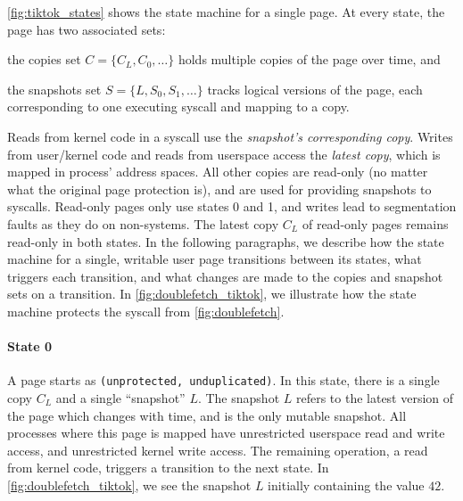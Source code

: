 \documentclass[letterpaper,twocolumn,10pt, anonymous]{article}
\begin{document}
\autoref{fig:tiktok_states} shows the state machine for a single page.
At every state, the page has two associated sets:
\begin{inparaenum}
  \item the copies set $C = \{C_L, C_0, \dots\}$ holds multiple copies of the page over time, and
  \item the snapshots set $S = \{L, S_0, S_1, \dots\}$ tracks logical versions of the page, each corresponding to one executing syscall and mapping to a copy. 
\end{inparaenum}
Reads from kernel code in a syscall use the \emph{snapshot's corresponding copy}.
Writes from user/kernel code and reads from userspace access the \emph{latest 
copy}, which is mapped in process' address spaces.
All other copies are read-only (no matter what the original page protection is), and are used for providing snapshots to syscalls.
Read-only pages only use states 0 and 1, and writes lead to segmentation faults
as they do on non-\tiktok systems.
The latest copy $C_L$ of read-only pages remains read-only in both states.
In the following paragraphs, we describe how the state machine for a single, 
writable user page transitions between its states, what triggers each transition, 
and what changes are made to the copies and snapshot sets on a transition.
In \autoref{fig:doublefetch_tiktok}, we illustrate how the state machine protects the 
syscall from \autoref{fig:doublefetch}.

\paragraph{State 0}
A page starts as \texttt{(unprotected, unduplicated)}.
In this state, there is a single copy $C_L$ and a single ``snapshot'' $L$. 
The snapshot $L$ refers to the latest version of the page which changes 
with time, and is the only mutable snapshot.
All processes where this page is mapped have unrestricted userspace read and write 
access, and unrestricted kernel write access.
The remaining operation, a read from kernel code, triggers a transition to 
the next state.
In \autoref{fig:doublefetch_tiktok}, we see the snapshot $L$ initially containing 
the value $42$.
\end{document}
